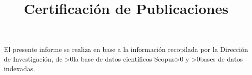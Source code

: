 \documentclass[fleqn,10pt]{wlscirep}
\title{Certificación de Publicaciones\small\hfill\thedate}
\author[]{\docente}
\affil[]{\departamento}
\affil[]{Escuela Politécnica Nacional}
\begin{document}
\flushbottom
\maketitle
{}
%
%
\thispagestyle{empty}

\noindent El presente informe se realiza en base a la información recopilada por la Dirección de Investigación, de \ifnum\numpublicacionesscopus>0{la base de datos científicos Scopus\ifnum\numpublicacionesregionales>0{ y }\fi}\fi \ifnum\numpublicacionesregionales>0{bases de datos indexadas}\fi.
\end{document}
